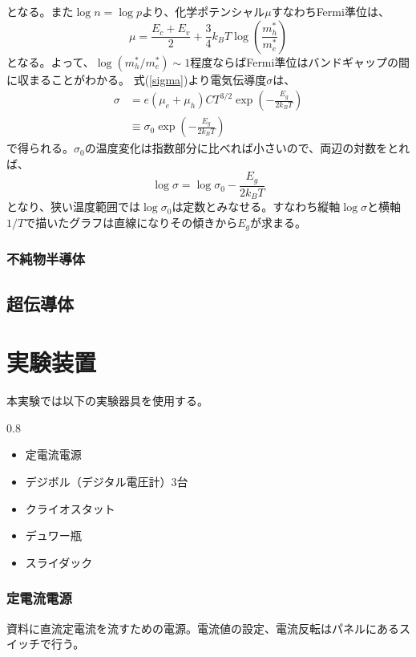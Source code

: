 \documentclass[11pt, titlepage, openany]{ltjsbook}
\begin{document}
となる。また$\log n = \log p$より、化学ポテンシャル$\mu$すなわちFermi準位は、
\begin{equation}
  \mu = \frac{E_c + E_v}{2} + \frac{3}{4} k_B T \log \left(\frac{m_h^*}{m_e^*}\right)
\end{equation}
となる。よって、$\log \left(m_h^*/m_e^*\right) \sim 1$程度ならばFermi準位はバンドギャップの間に収まることがわかる。
式(\ref{sigma})より電気伝導度$\sigma$は、
\begin{align}
  \sigma & = e(\mu_e + \mu_h)CT^{3/2} \exp \left( - \frac{E_g}{2k_B T}\right) \\
  & \equiv \sigma_0 \exp \left( - \frac{E_g}{2k_B T}\right)
\end{align}
で得られる。$\sigma_0$の温度変化は指数部分に比べれば小さいので、両辺の対数をとれば、
\begin{equation}
  \log \sigma = \log \sigma_0 - \frac{E_g}{2k_B T}
\end{equation}
となり、狭い温度範囲では$\log \sigma_0$は定数とみなせる。すなわち縦軸$\log \sigma$と横軸$1/T$で描いたグラフは直線になりその傾きから$E_g$が求まる。
\subsubsection{不純物半導体}
\subsection{超伝導体}

\section{実験装置}
本実験では以下の実験器具を使用する。
\begin{center}
    \begin{varwidth}{0.8\textwidth}
        \begin{itemize}
            \item 定電流電源
            \item デジボル（デジタル電圧計）3台
            \item クライオスタット
            \item デュワー瓶
            \item スライダック
        \end{itemize}
    \end{varwidth}
\end{center}
\subsubsection{定電流電源}
資料に直流定電流を流すための電源。電流値の設定、電流反転はパネルにあるスイッチで行う。
\end{document}
